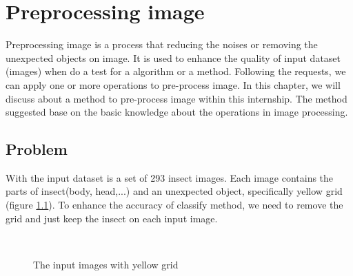 \chapter{Preprocessing image}
Preprocessing image is a process that reducing the noises or removing the unexpected objects on image. It is used to enhance the quality of input dataset (images) when do a test for a algorithm or a method. Following the requests, we can apply one or more operations to pre-process image. In this chapter, we will discuss about a method to pre-process image within this internship. The method suggested base on the basic knowledge about the operations in image processing.
\section{Problem}
With the input dataset is a set of 293 insect images. Each image contains the parts of insect(body, head,...) and an unexpected object, specifically yellow grid (figure \ref{fig:figure_31}). To enhance the accuracy of classify method, we need to remove the grid and just keep the insect on each input image.
\begin{figure}[h!]
\centering
{}~~
\caption{The input images with yellow grid}
\label{fig:figure_31}
\end{figure}
